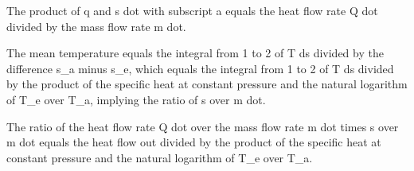 The product of q and s dot with subscript a equals the heat flow rate Q dot divided by the mass flow rate m dot.

The mean temperature equals the integral from 1 to 2 of T ds divided by the difference s_a minus s_e, which equals the integral from 1 to 2 of T ds divided by the product of the specific heat at constant pressure and the natural logarithm of T_e over T_a, implying the ratio of s over m dot.

The ratio of the heat flow rate Q dot over the mass flow rate m dot times s over m dot equals the heat flow out divided by the product of the specific heat at constant pressure and the natural logarithm of T_e over T_a.